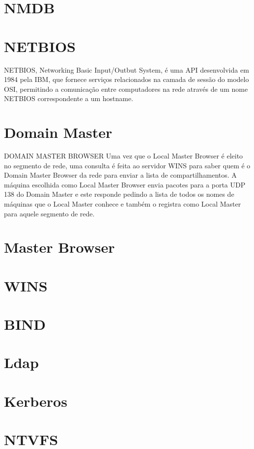 \section{NMDB}

\section{NETBIOS}

NETBIOS, Networking Basic Input/Outbut System, é uma API desenvolvida em 1984 pela IBM, que fornece serviços relacionados na camada de sessão do modelo OSI, permitindo a comunicação entre computadores na rede através de um nome NETBIOS correspondente a um hostname.

\section{Domain Master}

DOMAIN MASTER BROWSER Uma vez que o Local Master Browser é eleito no segmento de rede, uma consulta é feita ao servidor WINS para saber quem é o Domain Master Browser da rede para enviar a lista de compartilhamentos. A máquina escolhida como Local Master Browser envia pacotes para a porta UDP 138 do Domain Master e este responde pedindo a lista de todos os nomes de máquinas que o Local Master conhece e também o registra como Local Master para aquele segmento de rede.

\section{Master Browser}

\section{WINS}

\section{BIND}

\section{Ldap}

\section{Kerberos}

\section{NTVFS}

